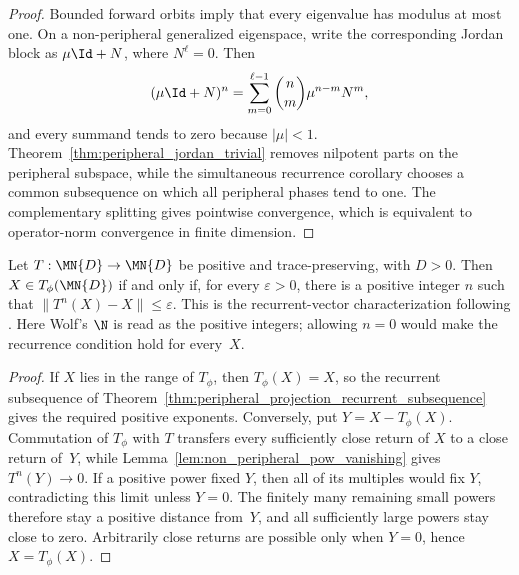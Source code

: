\begin{proof}\leanok
    Bounded forward orbits imply that every eigenvalue has modulus at most
    one. On a non-peripheral generalized eigenspace, write the corresponding
    Jordan block as $\mu\Id+N$, where $N^\ell=0$. Then
    \begin{align}
        (\mu\Id+N)^n
        =\sum_{m=0}^{\ell-1}\binom{n}{m}\mu^{n-m}N^m,
    \end{align}
    and every summand tends to zero because $|\mu|<1$.
    Theorem~\ref{thm:peripheral_jordan_trivial} removes nilpotent parts on the
    peripheral subspace, while the simultaneous recurrence corollary chooses a
    common subsequence on which all peripheral
    phases tend to one. The complementary splitting gives pointwise
    convergence, which is equivalent to operator-norm convergence in finite
    dimension.
\end{proof}

\begin{theorem}
    \label{thm:peripheral_range_recurrent_vectors}
    \leanok
    Let $T:\MN{D}\to\MN{D}$ be positive and trace-preserving, with $D>0$.
    Then $X\in T_\phi(\MN{D})$ if and only if, for every
    $\varepsilon>0$, there is a positive integer $n$ such that
    $\lVert T^n(X)-X\rVert\leq\varepsilon$. This is the recurrent-vector
    characterization following \cite[Equation~(6.15)]{Wolf2012Quantum}.
    Here Wolf's $\N$ is read as the positive integers; allowing $n=0$ would
    make the recurrence condition hold for every~$X$.
\end{theorem}

\begin{proof}\leanok
    If $X$ lies in the range of $T_\phi$, then $T_\phi(X)=X$, so the
    recurrent subsequence of
    Theorem~\ref{thm:peripheral_projection_recurrent_subsequence} gives the
    required positive exponents. Conversely, put
    $Y=X-T_\phi(X)$. Commutation of $T_\phi$ with $T$ transfers every
    sufficiently close return of $X$ to a close return of~$Y$, while
    Lemma~\ref{lem:non_peripheral_pow_vanishing} gives $T^n(Y)\to0$.
    If a positive power fixed $Y$, then all of its multiples would fix $Y$,
    contradicting this limit unless $Y=0$. The finitely many remaining small
    powers therefore stay a positive distance from~$Y$, and all sufficiently
    large powers stay close to zero. Arbitrarily close returns are possible
    only when $Y=0$, hence $X=T_\phi(X)$.
\end{proof}

